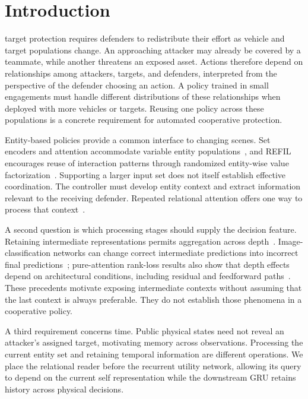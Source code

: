 \section{Introduction}
 target protection requires defenders to redistribute their effort as vehicle and target populations change. An approaching attacker may already be covered by a teammate, while another threatens an exposed asset. Actions therefore depend on relationships among attackers, targets, and defenders, interpreted from the perspective of the defender choosing an action. A policy trained in small engagements must handle different distributions of these relationships when deployed with more vehicles or targets. Reusing one policy across these populations is a concrete requirement for automated cooperative protection.

Entity-based policies provide a common interface to changing scenes. Set encoders and attention accommodate variable entity populations~\cite{zaheer2017deepsets,lee2019settransformer}, and REFIL encourages reuse of interaction patterns through randomized entity-wise value factorization~\cite{iqbal2021refil}. Supporting a larger input set does not itself establish effective coordination. The controller must develop entity context and extract information relevant to the receiving defender. Repeated relational attention offers one way to process that context~\cite{zambaldi2019relational,dehghani2019universal}.

A second question is which processing stages should supply the decision feature. Retaining intermediate representations permits aggregation across depth~\cite{xu2018jk}. Image-classification networks can change correct intermediate predictions into incorrect final predictions~\cite{kaya2019overthinking}; pure-attention rank-loss results also show that depth effects depend on architectural conditions, including residual and feedforward paths~\cite{dong2021attention}. These precedents motivate exposing intermediate contexts without assuming that the last context is always preferable. They do not establish those phenomena in a cooperative policy.

A third requirement concerns time. Public physical states need not reveal an attacker's assigned target, motivating memory across observations. Processing the current entity set and retaining temporal information are different operations. We place the relational reader before the recurrent utility network, allowing its query to depend on the current self representation while the downstream GRU retains history across physical decisions.

